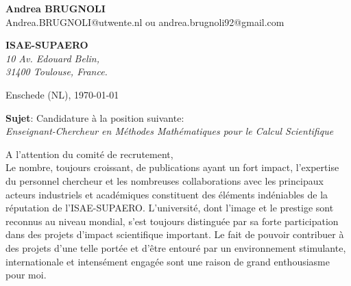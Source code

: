 \documentclass[11pt]{letter}
\begin{document}
	\sffamily
	\begin{flushleft}
		{\bfseries Andrea \textsc{BRUGNOLI}}\\[.35ex]
		Andrea.BRUGNOLI@utwente.nl ou andrea.brugnoli92@gmail.com
	\end{flushleft}
	\begin{flushright}
		{\bfseries ISAE-SUPAERO}\\[.35ex]
		\small\itshape
		10 Av. Edouard Belin,  \\
		31400 Toulouse, France.
	\end{flushright}
	\begin{flushright}
		Enschede (NL), \today 
	\end{flushright}
	\textbf{Sujet}: Candidature \`a la position suivante:\\
	\textit{Enseignant-Chercheur en Méthodes Mathématiques pour le Calcul Scientifique}
	
	
	A l'attention du comité de recrutement, \\
	Le nombre, toujours croissant, de publications ayant un fort impact, l'expertise du personnel chercheur et les nombreuses collaborations avec les principaux acteurs industriels et académiques constituent des éléments indéniables de la réputation de l'ISAE-SUPAERO. L'université, dont l'image et le prestige sont reconnus au niveau mondial, s'est toujours distinguée par sa forte participation dans des projets d'impact scientifique important. Le fait de pouvoir contribuer à des projets d'une telle portée et d'être entouré par un environnement stimulante, internationale et intensément engagée sont une raison de grand enthousiasme pour moi. 
	
\end{document}
